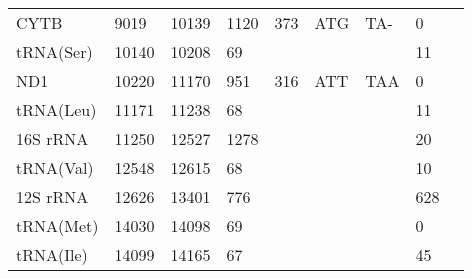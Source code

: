 \documentclass[../DISSERTACAO_MAIN.tex]{subfiles}
\begin{document}
\begin{longtable}{llllllllllllllllllllll}
			CYTB         & \multicolumn{2}{l}{9019}    & \multicolumn{2}{l}{10139}   & \multicolumn{2}{l}{1120}        & \multicolumn{3}{l}{373}                       & \multicolumn{3}{l}{ATG}   & \multicolumn{3}{l}{TA-}     & \multicolumn{3}{l}{0}           & \multicolumn{3}{l}{}         \\
			tRNA(Ser)    & \multicolumn{2}{l}{10140}   & \multicolumn{2}{l}{10208}   & \multicolumn{2}{l}{69}          & \multicolumn{3}{l}{}                          & \multicolumn{3}{l}{}      & \multicolumn{3}{l}{}        & \multicolumn{3}{l}{11}          & \multicolumn{3}{l}{}         \\
			ND1          & \multicolumn{2}{l}{10220}   & \multicolumn{2}{l}{11170}   & \multicolumn{2}{l}{951}         & \multicolumn{3}{l}{316}                       & \multicolumn{3}{l}{ATT}   & \multicolumn{3}{l}{TAA}     & \multicolumn{3}{l}{0}           & \multicolumn{3}{l}{}         \\
			tRNA(Leu)    & \multicolumn{2}{l}{11171}   & \multicolumn{2}{l}{11238}   & \multicolumn{2}{l}{68}          & \multicolumn{3}{l}{}                          & \multicolumn{3}{l}{}      & \multicolumn{3}{l}{}        & \multicolumn{3}{l}{11}          & \multicolumn{3}{l}{}         \\
			16S 				rRNA & \multicolumn{2}{l}{11250}   & \multicolumn{2}{l}{12527}   & \multicolumn{2}{l}{1278}        & \multicolumn{3}{l}{}                          & \multicolumn{3}{l}{}      & \multicolumn{3}{l}{}        & \multicolumn{3}{l}{20}          & \multicolumn{3}{l}{}         \\
			tRNA(Val)    & \multicolumn{2}{l}{12548}   & \multicolumn{2}{l}{12615}   & \multicolumn{2}{l}{68}          & \multicolumn{3}{l}{}                          & \multicolumn{3}{l}{}      & \multicolumn{3}{l}{}        & \multicolumn{3}{l}{10}          & \multicolumn{3}{l}{}         \\
			12S 				rRNA & \multicolumn{2}{l}{12626}   & \multicolumn{2}{l}{13401}   & \multicolumn{2}{l}{776}         & \multicolumn{3}{l}{}                          & \multicolumn{3}{l}{}      & \multicolumn{3}{l}{}        & \multicolumn{3}{l}{628}         & \multicolumn{3}{l}{}         \\
			tRNA(Met)    & \multicolumn{2}{l}{14030}   & \multicolumn{2}{l}{14098}   & \multicolumn{2}{l}{69}          & \multicolumn{3}{l}{}                          & \multicolumn{3}{l}{}      & \multicolumn{3}{l}{}        & \multicolumn{3}{l}{0}           & \multicolumn{3}{l}{}         \\
			tRNA(Ile)    & \multicolumn{2}{l}{14099}   & \multicolumn{2}{l}{14165}   & \multicolumn{2}{l}{67}          & \multicolumn{3}{l}{}                          & \multicolumn{3}{l}{}      & \multicolumn{3}{l}{}        & \multicolumn{3}{l}{45}          & \multicolumn{3}{l}{}         \\

\end{longtable}
\end{document}
